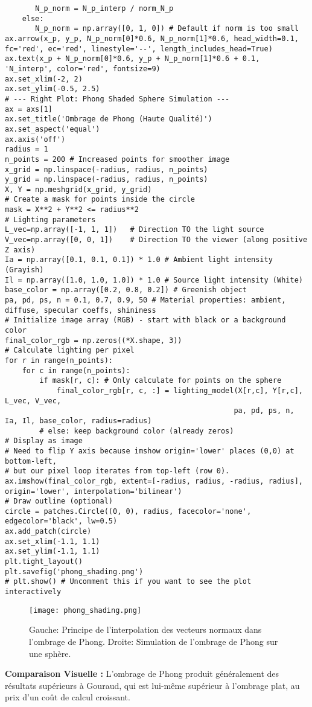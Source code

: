 \begin{verbatim}
       N_p_norm = N_p_interp / norm_N_p
    else:
       N_p_norm = np.array([0, 1, 0]) # Default if norm is too small
ax.arrow(x_p, y_p, N_p_norm[0]*0.6, N_p_norm[1]*0.6, head_width=0.1, fc='red', ec='red', linestyle='--', length_includes_head=True)
ax.text(x_p + N_p_norm[0]*0.6, y_p + N_p_norm[1]*0.6 + 0.1, 'N_interp', color='red', fontsize=9)
ax.set_xlim(-2, 2)
ax.set_ylim(-0.5, 2.5)
# --- Right Plot: Phong Shaded Sphere Simulation ---
ax = axs[1]
ax.set_title('Ombrage de Phong (Haute Qualité)')
ax.set_aspect('equal')
ax.axis('off')
radius = 1
n_points = 200 # Increased points for smoother image
x_grid = np.linspace(-radius, radius, n_points)
y_grid = np.linspace(-radius, radius, n_points)
X, Y = np.meshgrid(x_grid, y_grid)
# Create a mask for points inside the circle
mask = X**2 + Y**2 <= radius**2
# Lighting parameters
L_vec=np.array([-1, 1, 1])   # Direction TO the light source
V_vec=np.array([0, 0, 1])    # Direction TO the viewer (along positive Z axis)
Ia = np.array([0.1, 0.1, 0.1]) * 1.0 # Ambient light intensity (Grayish)
Il = np.array([1.0, 1.0, 1.0]) * 1.0 # Source light intensity (White)
base_color = np.array([0.2, 0.8, 0.2]) # Greenish object
pa, pd, ps, n = 0.1, 0.7, 0.9, 50 # Material properties: ambient, diffuse, specular coeffs, shininess
# Initialize image array (RGB) - start with black or a background color
final_color_rgb = np.zeros((*X.shape, 3))
# Calculate lighting per pixel
for r in range(n_points):
    for c in range(n_points):
        if mask[r, c]: # Only calculate for points on the sphere
            final_color_rgb[r, c, :] = lighting_model(X[r,c], Y[r,c], L_vec, V_vec,
                                                     pa, pd, ps, n, Ia, Il, base_color, radius=radius)
        # else: keep background color (already zeros)
# Display as image
# Need to flip Y axis because imshow origin='lower' places (0,0) at bottom-left,
# but our pixel loop iterates from top-left (row 0).
ax.imshow(final_color_rgb, extent=[-radius, radius, -radius, radius], origin='lower', interpolation='bilinear')
# Draw outline (optional)
circle = patches.Circle((0, 0), radius, facecolor='none', edgecolor='black', lw=0.5)
ax.add_patch(circle)
ax.set_xlim(-1.1, 1.1)
ax.set_ylim(-1.1, 1.1)
plt.tight_layout()
plt.savefig('phong_shading.png')
# plt.show() # Uncomment this if you want to see the plot interactively
\end{verbatim}
\begin{figure}[H]
\centering
\texttt{[image: phong\_shading.png]}
\caption{Gauche: Principe de l'interpolation des vecteurs normaux dans l'ombrage de Phong. Droite: Simulation de l'ombrage de Phong sur une sphère.}
\label{fig:phong_shading}
\end{figure}
\textbf{Comparaison Visuelle :} L'ombrage de Phong produit généralement des résultats supérieurs à Gouraud, qui est lui-même supérieur à l'ombrage plat, au prix d'un coût de calcul croissant.
